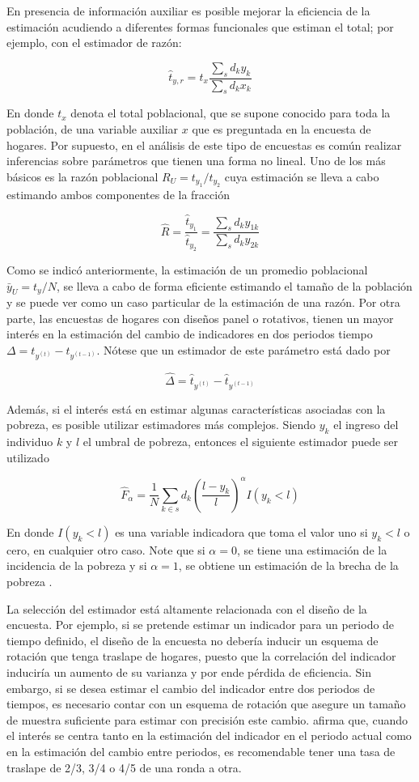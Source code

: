 \documentclass[
  12pt,
]{book}
\begin{document}
En presencia de información auxiliar es posible mejorar la eficiencia de la estimación acudiendo a diferentes formas funcionales que estiman el total; por ejemplo, con el estimador de razón:

\[
\hat{t}_{y, r} = t_x \frac{\sum_s d_k y_k}{\sum_s d_k x_k}
\]

En donde \(t_x\) denota el total poblacional, que se supone conocido para toda la población, de una variable auxiliar \(x\) que es preguntada en la encuesta de hogares. Por supuesto, en el análisis de este tipo de encuestas es común realizar inferencias sobre parámetros que tienen una forma no lineal. Uno de los más básicos es la razón poblacional \(R_U = t_{y_1} / t_{y_2}\) cuya estimación se lleva a cabo estimando ambos componentes de la fracción

\[
\hat{R}= \frac{\hat{t}_{y_1}}{\hat{t}_{y_2}}
= \frac{\sum_s d_k y_{1k}} {\sum_s d_k y_{2k}}
\]

Como se indicó anteriormente, la estimación de un promedio poblacional \(\bar{y}_U = t_y / N\), se lleva a cabo de forma eficiente estimando el tamaño de la población y se puede ver como un caso particular de la estimación de una razón. Por otra parte, las encuestas de hogares con diseños panel o rotativos, tienen un mayor interés en la estimación del cambio de indicadores en dos periodos tiempo \(\Delta = t_{y^{(t)}} - t_{y^{(t-1)}}\). Nótese que un estimador de este parámetro está dado por

\[
\hat{\Delta} = \hat{t}_{y^{(t)}} - \hat{t}_{y^{(t-1)}}
\]

Además, si el interés está en estimar algunas características asociadas con la pobreza, es posible utilizar estimadores más complejos. Siendo \(y_k\) el ingreso del individuo \(k\) y \(l\) el umbral de pobreza, entonces el siguiente estimador puede ser utilizado

\[
\hat{F}_{\alpha}=\frac{1}{N}\sum_{k\in s} d_k 
\left(\frac{l-y_k}{l}\right)^{\alpha}I(y_k<l)
\]

En donde \(I(y_k<l)\) es una variable indicadora que toma el valor uno si \(y_k<l\) o cero, en cualquier otro caso. Note que si \(\alpha = 0\), se tiene una estimación de la incidencia de la pobreza y si \(\alpha = 1\), se obtiene un estimación de la brecha de la pobreza \citep{Foster_Greer_Thorbecke_1984}.

La selección del estimador está altamente relacionada con el diseño de la encuesta. Por ejemplo, si se pretende estimar un indicador para un periodo de tiempo definido, el diseño de la encuesta no debería inducir un esquema de rotación que tenga traslape de hogares, puesto que la correlación del indicador induciría un aumento de su varianza y por ende pérdida de eficiencia. Sin embargo, si se desea estimar el cambio del indicador entre dos periodos de tiempos, es necesario contar con un esquema de rotación que asegure un tamaño de muestra suficiente para estimar con precisión este cambio. \citet[sección 12.13]{Cochran_1977} afirma que, cuando el interés se centra tanto en la estimación del indicador en el periodo actual como en la estimación del cambio entre periodos, es recomendable tener una tasa de traslape de 2/3, 3/4 o 4/5 de una ronda a otra.
\end{document}
